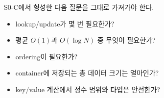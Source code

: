 S0-C에서 형성한 다음 질문을 그대로 가져가야 한다.
\begin{itemize}
  \item lookup/update가 몇 번 필요한가?
  \item 평균 $O(1)$과 $O(\log N)$ 중 무엇이 필요한가?
  \item ordering이 필요한가?
  \item container에 저장되는 총 데이터 크기는 얼마인가?
  \item key/value 계산에서 정수 범위와 타입은 안전한가?
\end{itemize}

